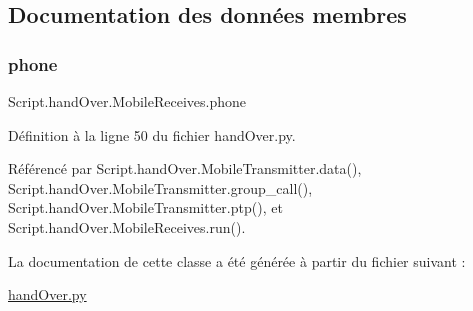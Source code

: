 \subsection{Documentation des données membres}
\mbox{\label{classScript_1_1handOver_1_1MobileReceives_abb579ed112e4ce4e91762febd524d789}} 
\subsubsection{\texorpdfstring{phone}{phone}}
{\footnotesize\ttfamily Script.\+hand\+Over.\+Mobile\+Receives.\+phone}



Définition à la ligne 50 du fichier hand\+Over.\+py.



Référencé par Script.\+hand\+Over.\+Mobile\+Transmitter.\+data(), Script.\+hand\+Over.\+Mobile\+Transmitter.\+group\+\_\+call(), Script.\+hand\+Over.\+Mobile\+Transmitter.\+ptp(), et Script.\+hand\+Over.\+Mobile\+Receives.\+run().



La documentation de cette classe a été générée à partir du fichier suivant \+:\begin{DoxyCompactItemize}
\item 
\hyperlink{handOver_8py}{hand\+Over.\+py}\end{DoxyCompactItemize}
